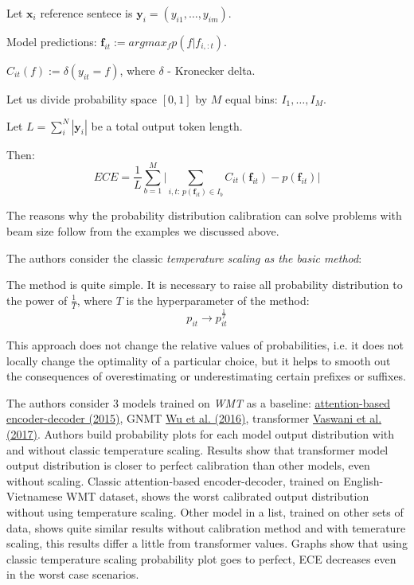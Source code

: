 \documentclass[a4paper,14pt]{extarticle}
\newcommand{\bibref}[3]{\hyperlink{#1}{#2 (#3)}}
\begin{document}
	Let $\mathbf{x}_i$ reference sentece is $\mathbf{y}_i = (y_{i1}, \dots, y_{im})$.
	
	Model predictions: $\mathbf{f}_{it} := argmax_{f} p(f | f_{i, :t})$.
	
	$C_{it}(f) := \delta(y_{it} = f)$, where $\delta$ - Kronecker delta.
	
	Let us divide probability space $[0, 1]$ by $M$ equal bins: $I_1, \dots, I_M$.
	
	Let $L = \sum_i^N |\mathbf{y}_i|$ be a total output token length.
	
	Then:
	\begin{equation}
		ECE = \frac1{L}\sum_{b=1}^{M}\Big|\sum_{i, t:\, p(\mathbf{f}_{it}) \in I_b} C_{it}(\mathbf{f}_{it}) - p(\mathbf{f}_{it})\Big|
	\end{equation}
	
	The reasons why the probability distribution calibration can solve problems with beam size follow from the examples we discussed above.
	
	The authors consider the classic \textit{temperature scaling as the basic method}:
	
	The method is quite simple. It is necessary to raise all probability distribution to the power of $\frac1{T}$, where $T$ is the hyperparameter of the method:
	\[
		p_{it} \rightarrow p_{it}^{\frac1{T}}
	\]
	
	This approach does not change the relative values of probabilities, i.e. it does not locally change the optimality of a particular choice, but it helps to smooth out the consequences of overestimating or underestimating certain prefixes or suffixes.
	
	The authors consider 3 models trained on \textit{WMT} as a baseline: \bibref{encdec_att}{attention-based encoder-decoder}{2015}, GNMT \bibref{gnmt}{Wu et al.}{2016}, transformer \bibref{transformer}{Vaswani et al.}{2017}. Authors build probability plots for each model output distribution with and without classic temperature scaling. Results show that transformer model output distribution is closer to perfect calibration than other models, even without scaling. Classic attention-based encoder-decoder, trained on English-Vietnamese WMT dataset, shows the worst calibrated output distribution without using temperature scaling. Other model in a list, trained on other sets of data, shows quite similar results without calibration method and with temerature scaling, this results differ a little from transformer values. Graphs show that using classic temperature scaling probability plot goes to perfect, ECE decreases even in the worst case scenarios. 
	
\end{document}

